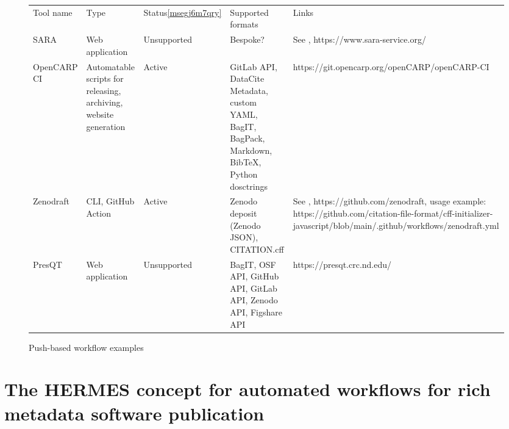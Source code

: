 \documentclass{article}
\begin{document}
\begin{figure}
\begin{tabular}{*5{l}}
Tool name

& Type

& Status\ref{msegj6m7qry}

& Supported formats

& Links

\\
SARA

& Web application

& Unsupported

& Bespoke?

& See \cite{138880/UM3ZH6ZQ}, https://www.sara-service.org/

\\
OpenCARP CI

& Automatable scripts for releasing, archiving, website generation

& Active

& GitLab API, DataCite Metadata, custom YAML, BagIT, BagPack, Markdown, BibTeX, Python dosctrings

& https://git.opencarp.org/openCARP/openCARP-CI

\\
Zenodraft

& CLI, GitHub Action

& Active

& Zenodo deposit (Zenodo JSON), CITATION.cff

& See \cite{138880/KWIHDXNN}, https://github.com/zenodraft, usage example: https://github.com/citation-file-format/cff-initializer-javascript/blob/main/.github/workflows/zenodraft.yml

\\
PresQT

& Web application

& Unsupported

& BagIT, OSF API, GitHub API, GitLab API, Zenodo API, Figshare API

& https://presqt.crc.nd.edu/

\\
\end{tabular}
\caption{Push-based workflow examples}
\label{txalpo9fsoli}
\end{figure}

\section{The HERMES concept for automated workflows for rich metadata software publication}\label{az624rg}
\end{document}
